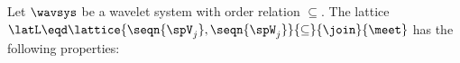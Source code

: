 \begin{proposition}
\label{prop:order_wavstrct}
Let $\wavsys$ be a wavelet system with order relation $\subseteq$.
The lattice $\latL\eqd\lattice{\seqn{\spV_j},\seqn{\spW_j}}{\subseteq}{\join}{\meet}$ has 
the following properties:
\end{proposition}

